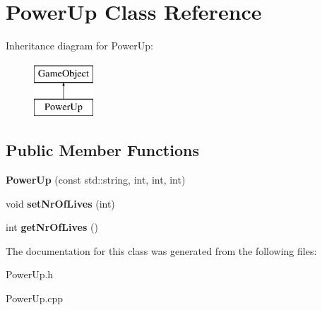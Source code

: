 \hypertarget{class_power_up}{}\section{Power\+Up Class Reference}
\label{class_power_up}
Inheritance diagram for Power\+Up\+:\begin{figure}[H]
\begin{center}
\leavevmode
\includegraphics[height=2.000000cm]{class_power_up}
\end{center}
\end{figure}
\subsection*{Public Member Functions}
\begin{DoxyCompactItemize}
\item 
\mbox{\label{class_power_up_a1146d214489e9f66e80b0d9905ce6aef}} 
{\bfseries Power\+Up} (const std\+::string, int, int, int)
\item 
\mbox{\label{class_power_up_a0358e4edc1c61e26e0c7018b3ebef118}} 
void {\bfseries set\+Nr\+Of\+Lives} (int)
\item 
\mbox{\label{class_power_up_a20b1f2fa6a06891bdac68103f16816f1}} 
int {\bfseries get\+Nr\+Of\+Lives} ()
\end{DoxyCompactItemize}


The documentation for this class was generated from the following files\+:\begin{DoxyCompactItemize}
\item 
Power\+Up.\+h\item 
Power\+Up.\+cpp\end{DoxyCompactItemize}
